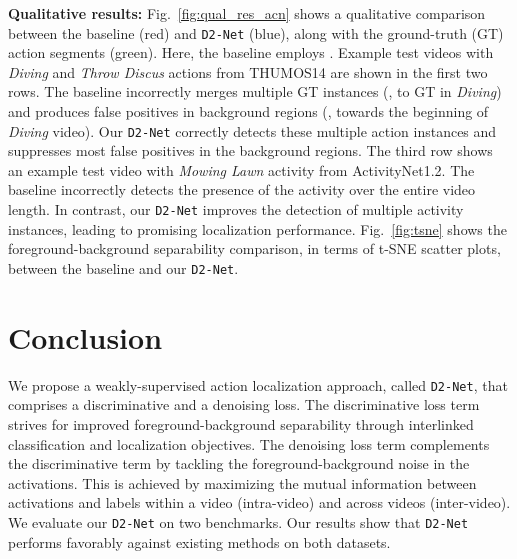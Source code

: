 \documentclass[final]{cvpr}
\def\proposed{\texttt{D2-Net}{}}
\begin{document}
\noindent\textbf{Qualitative results:}
Fig.~\ref{fig:qual_res_acn} shows a qualitative comparison between the baseline (red) and \proposed{} (blue), along with the ground-truth (GT) action segments (green). Here, the baseline employs . Example test videos with \textit{Diving} and \textit{Throw Discus} actions from THUMOS14 are shown in the first two rows. The baseline incorrectly merges multiple GT instances (\eg,  to  GT in \textit{Diving}) and produces false positives in background regions (\eg, towards the beginning of \textit{Diving} video). Our \proposed{} correctly detects these multiple action instances and suppresses most false positives in the background regions. The third row shows an example test video with \textit{Mowing Lawn} activity from ActivityNet1.2. The baseline incorrectly detects the presence of the activity over the entire video length. In contrast, our \proposed{} improves the detection of multiple activity instances, leading to promising localization performance. 
Fig.~\ref{fig:tsne} shows the foreground-background separability comparison, in terms of t-SNE scatter plots, between the baseline and our \proposed{}. 






\section{Conclusion}
We propose a weakly-supervised action localization approach, called \proposed{}, that comprises a discriminative and a denoising loss. 
The discriminative loss term strives for improved foreground-background separability through interlinked classification and localization objectives. The denoising loss term complements the discriminative term by tackling the foreground-background noise in the activations. This is achieved by maximizing the mutual information between activations and labels within a video (intra-video) and across videos (inter-video). We evaluate our \proposed{} on two benchmarks. Our results show that \proposed{} performs favorably against existing methods on both datasets. 








\end{document}
